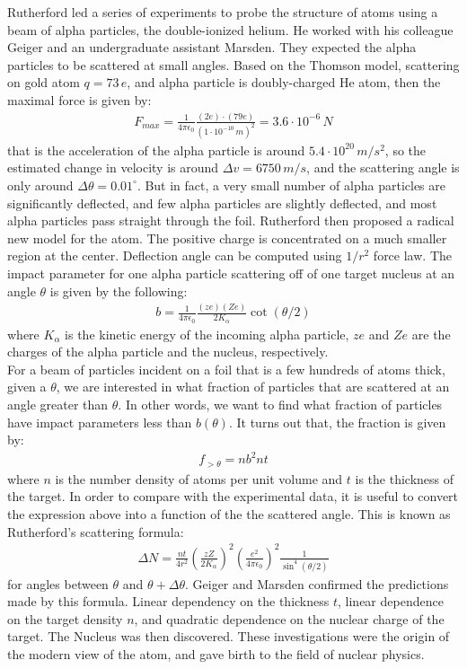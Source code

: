\documentclass[11pt]{article}
\theoremstyle{break}
\theoremstyle{break}
\newcommand{\ee}[1]{\cdot 10^{#1}}
\begin{document}
Rutherford led a series of experiments to probe the structure of atoms using a beam of alpha particles, the double-ionized helium. He worked with his colleague Geiger and an undergraduate assistant Marsden. They expected the alpha particles to be scattered at small angles. Based on the Thomson model, scattering on gold atom $q = 73\, e$, and alpha particle is doubly-charged He atom, then the maximal force is given by:
\begin{align*}
F_{max} = \frac{1}{4\pi \epsilon_0} \frac{(2e)\cdot (79e)}{(1\ee{-10}\, m)^2} = 3.6\ee{-6}\, N
\end{align*} 
that is the acceleration of the alpha particle is around $5.4\ee{20}\, m/s^2$, so the estimated change in velocity is around $\Delta v = 6750\, m/s$, and the scattering angle is only around $\Delta \theta = 0.01^\circ$. But in fact, a very small number of alpha particles are significantly deflected, and few alpha particles are slightly deflected, and most alpha particles pass straight through the foil. Rutherford then proposed a radical new model for the atom. The positive charge is concentrated on a much smaller region at the center. Deflection angle can be computed using $1/r^2$ force law. The impact parameter for one alpha particle scattering off of one target nucleus at an angle $\theta$ is given by the following:
\begin{align*}
b = \frac{1}{4\pi \epsilon_0} \frac{(ze)(Ze)}{2K_{\alpha}} \cot(\theta/2)
\end{align*}
where $K_{\alpha}$ is the kinetic energy of the incoming alpha particle, $ze$ and $Ze$ are the charges of the alpha particle and the nucleus, respectively. \\

For a beam of particles incident on a foil that is a few hundreds of atoms thick, given a $\theta$, we are interested in what fraction of particles that are scattered at an angle greater than $\theta$. In other words, we want to find what fraction of particles have impact parameters less than $b(\theta)$. It turns out that, the fraction is given by:
\begin{align*}
f_{>\theta} = nb^2 nt
\end{align*}
where $n$ is the number density of atoms per unit volume and $t$ is the thickness of the target. In order to compare with the experimental data, it is useful to convert the expression above into a function of the the scattered angle. This is known as Rutherford's scattering formula:
\begin{align*}
\Delta N = \frac{nt}{4r^2}\left( \frac{zZ}{2K_{\alpha}}\right)^2\left( \frac{e^2}{4\pi \epsilon_0}\right)^2 \frac{1}{\sin^4(\theta/2)}
\end{align*}
for angles between $\theta$ and $\theta + \Delta \theta$. Geiger and Marsden confirmed the predictions made by this formula. Linear dependency on the thickness $t$, linear dependence on the target density $n$, and quadratic dependence on the nuclear charge of the target.
The Nucleus was then discovered.
These investigations were the origin of the modern view of the atom, and gave birth to the field of nuclear physics. \\
\end{document}

